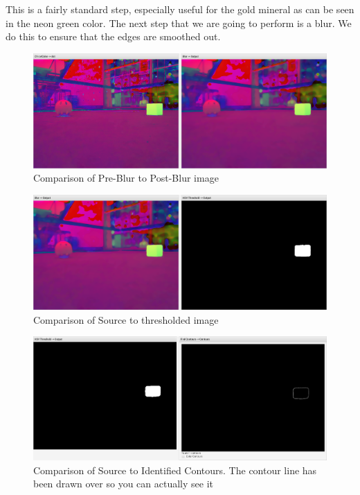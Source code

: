 \documentclass[../main.tex]{subfiles}
\begin{document}
This is a fairly standard step, especially useful for the gold mineral as can be seen in the neon green color. The next step that we are going to perform is a blur. We do this to ensure that the edges are smoothed out. 
\begin{figure}[H]
    \centering
    \includegraphics[width=400pt]{sections/vision/images/opencv/gold_pipeline_blur.png}
    \caption{Comparison of Pre-Blur to Post-Blur image}
\end{figure}
\begin{figure}[H]
    \centering
    \includegraphics[width=400pt]{sections/vision/images/opencv/gold_pipeline_threshold.png}
    \caption{Comparison of Source to thresholded image}
\end{figure}
\begin{figure}[H]
    \centering
    \includegraphics[width=400pt]{sections/vision/images/opencv/gold_pipeline_contour.png}
    \caption{Comparison of Source to Identified Contours. The contour line has been drawn over so you can actually see it}
\end{figure}
\end{document}
